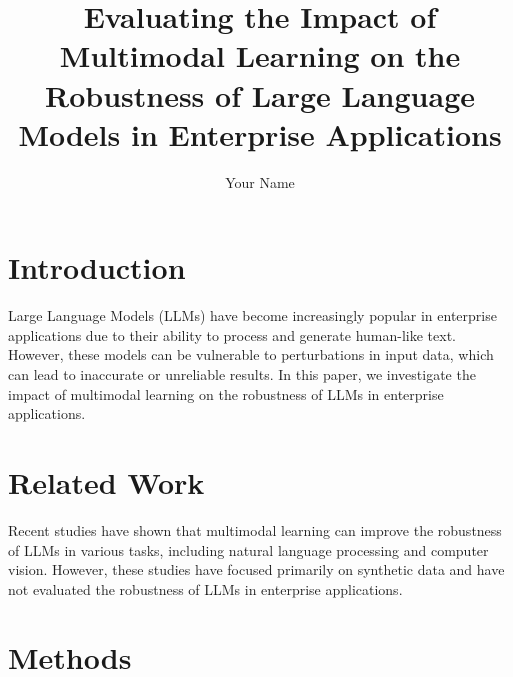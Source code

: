 \documentclass{article}
\begin{document}
\title{Evaluating the Impact of Multimodal Learning on the Robustness of Large Language Models in Enterprise Applications}

\author{Your Name}

\maketitle


\section{Introduction}

Large Language Models (LLMs) have become increasingly popular in enterprise applications due to their ability to process and generate human-like text. However, these models can be vulnerable to perturbations in input data, which can lead to inaccurate or unreliable results. In this paper, we investigate the impact of multimodal learning on the robustness of LLMs in enterprise applications.

\section{Related Work}

Recent studies have shown that multimodal learning can improve the robustness of LLMs in various tasks, including natural language processing and computer vision. However, these studies have focused primarily on synthetic data and have not evaluated the robustness of LLMs in enterprise applications.

\section{Methods}
\end{document}

